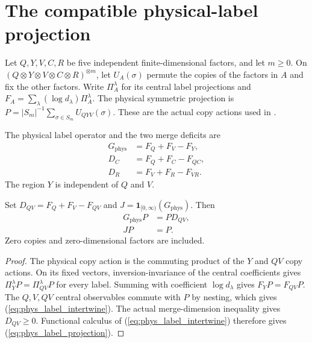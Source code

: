 \section{The compatible physical-label projection}
\label{sec:compatible-physical-label}

Let $Q,Y,V,C,R$ be five independent finite-dimensional factors, and let
$m\ge0$. On $(Q\otimes Y\otimes V\otimes C\otimes R)^{\otimes m}$, let
$U_A(\sigma)$ permute the copies of the factors in $A$ and fix the other
factors. Write $\Pi_A^\lambda$ for its central label projections and
$F_A=\sum_\lambda (\log d_\lambda)\Pi_A^\lambda$.
The physical symmetric projection is
$P=\lvert S_m\rvert^{-1}\sum_{\sigma\in S_m}U_{QYV}(\sigma)$.
These are the actual copy actions used in
\cite[Section~7, lines~501--522]{OpenAI2026AreaLaw}.

\begin{definition}
\label{def:physical-merge-deficit}
\leanok
The physical label operator and the two merge deficits are
\begin{align}
 G_{\mathrm{phys}}&=F_Q+F_V-F_Y,\label{eq:phys_label_definition}\\
 D_C&=F_Q+F_C-F_{QC},\\
 D_R&=F_V+F_R-F_{VR}.
\end{align}
The region $Y$ is independent of $Q$ and $V$.
\end{definition}

\begin{theorem}
\label{thm:physical-label-projection}
\leanok
Set $D_{QV}=F_Q+F_V-F_{QV}$ and
$J=\mathbf1_{[0,\infty)}(G_{\mathrm{phys}})$. Then
\begin{align}
 G_{\mathrm{phys}}P&=PD_{QV},\label{eq:phys_label_intertwine}\\
 JP&=P.\label{eq:phys_label_projection}
\end{align}
Zero copies and zero-dimensional factors are included.
\end{theorem}

\begin{proof}
\leanok
The physical copy action is the commuting product of the $Y$ and $QV$
copy actions. On its fixed vectors, inversion-invariance of the central
coefficients gives $\Pi_Y^\lambda P=\Pi_{QV}^\lambda P$ for every label.
Summing with coefficient $\log d_\lambda$ gives $F_YP=F_{QV}P$.
The $Q,V,QV$ central observables commute with $P$ by nesting, which gives
(\ref{eq:phys_label_intertwine}). The actual merge-dimension inequality
gives $D_{QV}\ge0$. Functional calculus of
(\ref{eq:phys_label_intertwine}) therefore gives
(\ref{eq:phys_label_projection}).
\end{proof}

